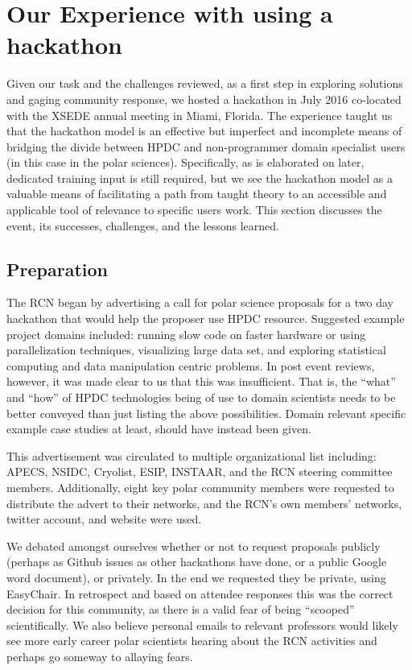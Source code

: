 \documentclass[conference]{IEEEtran}
\begin{document}
\section{Our Experience with using a hackathon}
Given our task and the challenges reviewed, as a first step in exploring solutions and gaging community response, we hosted a hackathon in July 2016 co-located with the XSEDE annual meeting in Miami, Florida. The experience taught us that the hackathon model is an effective but imperfect and incomplete means of bridging the divide between HPDC and non-programmer domain specialist users (in this case in the polar sciences).  Specifically, as is elaborated on later, dedicated training input is still required, but we see the hackathon model as a valuable means of facilitating a path from taught theory to an accessible and applicable tool of relevance to specific users work. This section discusses the event, its successes, challenges, and the lessons learned.

\subsection{Preparation}
The RCN began by advertising a call for polar science proposals for a two day hackathon that would help the proposer use HPDC resource.  Suggested example project domains included: running slow code on faster hardware or using parallelization techniques, visualizing large data set, and exploring statistical computing and data manipulation centric problems.  In post event reviews, however, it was made clear to us that this was insufficient. That is, the ``what'' and ``how'' of HPDC technologies being of use to domain scientists needs to be better conveyed than just listing the above possibilities.  Domain relevant specific example case studies at least, should have instead been given.

This advertisement was circulated to multiple organizational list including: APECS, NSIDC, Cryolist, ESIP, INSTAAR, and the RCN steering committee members.  Additionally, eight key polar community members were requested to distribute the advert to their networks, and the RCN's own members' networks, twitter account, and website were used.

We debated amongst ourselves whether or not to request proposals publicly (perhaps as Github issues as other hackathons have done, or a public Google word document), or privately.  In the end we requested they be private, using EasyChair.  In retrospect and based on attendee responses this was the correct decision for this community, as there is a valid fear of being ``scooped'' scientifically.  We also believe personal emails to relevant professors would likely see more early career polar scientists hearing about the RCN activities and perhaps go someway to allaying fears.
\end{document}
